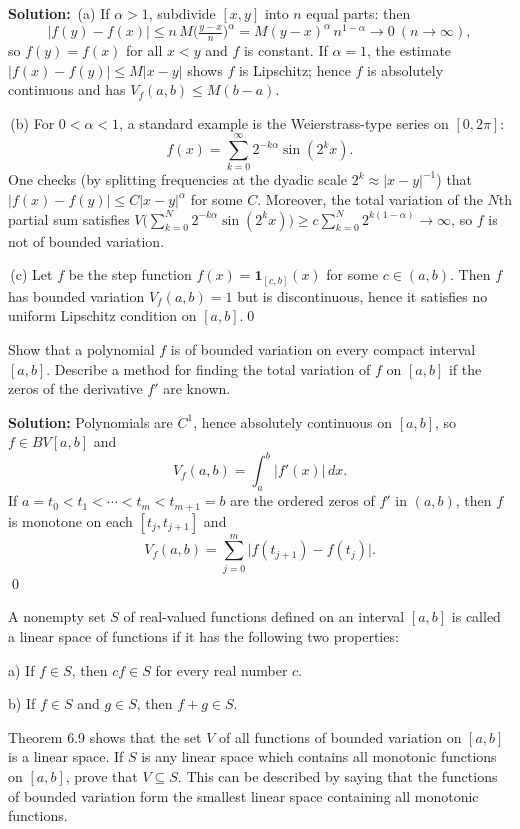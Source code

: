 \noindent\textbf{Solution:}
\,(a) If $\alpha>1$, subdivide $[x,y]$ into $n$ equal parts: then
\[|f(y)-f(x)|\le n\,M\Big(\tfrac{y-x}{n}\Big)^{\!\alpha}=M(y-x)^{\alpha}\,n^{1-\alpha}\to 0\ (n\to\infty),\]
so $f(y)=f(x)$ for all $x<y$ and $f$ is constant. If $\alpha=1$, the estimate $|f(x)-f(y)|\le M|x-y|$ shows $f$ is Lipschitz; hence $f$ is absolutely continuous and has $V_f(a,b)\le M(b-a)$.

\,(b) For $0<\alpha<1$, a standard example is the Weierstrass-type series on $[0,2\pi]$:
\[f(x)=\sum_{k=0}^{\infty}2^{-k\alpha}\sin(2^k x).\]
One checks (by splitting frequencies at the dyadic scale $2^k\approx |x-y|^{-1}$) that $|f(x)-f(y)|\le C|x-y|^{\alpha}$ for some $C$. Moreover, the total variation of the $N$th partial sum satisfies $V\big(\sum_{k=0}^N2^{-k\alpha}\sin(2^k x)\big)\ge c\sum_{k=0}^N2^{k(1-\alpha)}\to\infty$, so $f$ is not of bounded variation.

\,(c) Let $f$ be the step function $f(x)=\mathbf{1}_{[c,b]}(x)$ for some $c\in(a,b)$. Then $f$ has bounded variation $V_f(a,b)=1$ but is discontinuous, hence it satisfies no uniform Lipschitz condition on $[a,b]$.\qed


\begin{problembox}
Show that a polynomial $f$ is of bounded variation on every compact interval $[a, b]$. Describe a method for finding the total variation of $f$ on $[a, b]$ if the zeros of the derivative $f'$ are known.
\end{problembox}

\noindent\textbf{Solution:}
Polynomials are $C^1$, hence absolutely continuous on $[a,b]$, so $f\in BV[a,b]$ and
\[V_f(a,b)=\int_a^b |f'(x)|\,dx.\]
If $a=t_0<t_1<\cdots<t_m<t_{m+1}=b$ are the ordered zeros of $f'$ in $(a,b)$, then $f$ is monotone on each $[t_j,t_{j+1}]$ and
\[V_f(a,b)=\sum_{j=0}^{m}\big|f(t_{j+1})-f(t_j)\big|.\]\qed


\begin{problembox}
A nonempty set $S$ of real-valued functions defined on an interval $[a, b]$ is called a linear space of functions if it has the following two properties:

a) If $f \in S$, then $cf \in S$ for every real number $c$.

b) If $f \in S$ and $g \in S$, then $f + g \in S$.

Theorem 6.9 shows that the set $V$ of all functions of bounded variation on $[a, b]$ is a linear space. If $S$ is any linear space which contains all monotonic functions on $[a, b]$, prove that $V \subseteq S$. This can be described by saying that the functions of bounded variation form the smallest linear space containing all monotonic functions.
\end{problembox}

